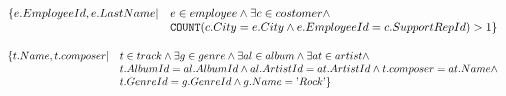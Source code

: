 \begin{exercise}{6}

\begin{subexercise}
  \begin{displaymath}
    \begin{array}{l l}
      \{ e.EmployeeId, e.LastName | & e \in employee \land \exists c \in costomer \land\\
              & \text{\texttt{COUNT}}( c.City = e.City \land e.EmployeeId =
              c.SupportRepId ) > 1 \}
    \end{array}
  \end{displaymath}
\end{subexercise}

\begin{subexercise}
  \begin{displaymath}
    \begin{array}{l l}
      \{ t.Name, t.composer | &t \in track \land \exists g\in genre \land
      \exists al\in album
      \land \exists at \in artist \land \\
            & t.AlbumId = al.AlbumId \land al.ArtistId = at.ArtistId \land
                t.composer = at.Name \land \\
            & t.GenreId = g.GenreId \land g.Name = \text{'}Rock\text{'}
        \}
    \end{array}
  \end{displaymath}
\end{subexercise}
\end{exercise}
